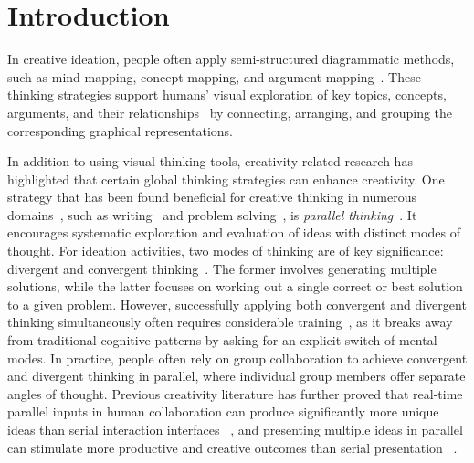 \section{Introduction}
In creative ideation, people often apply semi-structured diagrammatic methods, such as mind mapping, concept mapping, and argument mapping~\cite{baroudy2008procedural,mogahed2013planning}.
These thinking strategies support humans' visual exploration of key topics, concepts, arguments, and their relationships~\cite{lu2018inkplanner} by connecting, arranging, and grouping the corresponding graphical representations.


In addition to using visual thinking tools, creativity-related research has highlighted that certain global thinking strategies can enhance creativity.
One strategy that has been found beneficial for creative thinking in numerous domains~\cite{lo2017critical,dell2020four}, such as writing~\cite{al2018effect,al2015effect} and problem solving~\cite{peterson1998parallel}, is \textit{parallel thinking}~\cite{bono1985six,de2017six}.
It encourages systematic exploration and evaluation of ideas with distinct modes of thought.
For ideation activities, two modes of thinking are of key significance: divergent and convergent thinking~\cite{runco2023creativity}. The former involves generating multiple solutions, while the latter focuses on working out a single correct or best solution to a given problem.
However, successfully applying both convergent and divergent thinking simultaneously often requires considerable training~\cite{de2017six,gregory2012real}, as it breaks away from traditional cognitive patterns by asking for an explicit switch of mental modes.
In practice, people often rely on group collaboration to achieve convergent and divergent thinking in parallel, where individual group members offer separate angles of thought.
Previous creativity literature has further proved that real-time parallel inputs in human collaboration can produce significantly more unique ideas than serial interaction interfaces ~\cite{shih2009groupmind,hymes1992unblocking}, and presenting multiple ideas in parallel can stimulate more productive and creative outcomes than serial presentation ~\cite{dow2010parallel}.

